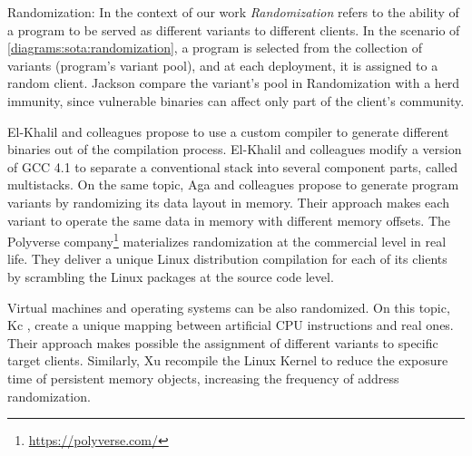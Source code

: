 
\begin{usage}{Randomization:}
    \label{usage:randomization}
    \normalfont
    In the context of our work \emph{Randomization} refers to the ability of a program to be served as different variants to different clients.
    In the scenario of \autoref{diagrams:sota:randomization}, a program is selected from the collection of variants (program's variant pool), and at each deployment, it is assigned to a random client. 
    Jackson \etal \cite{jackson} compare the variant's pool in Randomization with a herd immunity, since vulnerable binaries can affect only part of the client's community.

\end{usage}


El-Khalil and colleagues \cite{ElKhalil2004} propose to use a custom compiler to generate different binaries out of the compilation process. El-Khalil and colleagues modify a version of GCC 4.1 to separate a conventional stack into several component parts, called multistacks.
On the same topic, Aga and colleagues \cite{aga2019smokestack} propose to generate program variants by randomizing its data layout in memory. Their approach makes each variant to operate the same data in memory with different memory offsets.
The Polyverse company\footnote{\url{https://polyverse.com/}} materializes randomization at the commercial level in real life. They deliver a unique Linux distribution compilation for each of its clients by scrambling the Linux packages at the source code level.
    
Virtual machines and operating systems can be also randomized. On this topic, Kc \etal \cite{Kc03}, create a unique mapping between artificial CPU instructions and real ones. Their approach makes possible the assignment of different variants to specific target clients. Similarly, Xu \etal \cite{xu2020merr} recompile the Linux Kernel to reduce the exposure time of persistent memory objects, increasing the frequency of address randomization.

%


